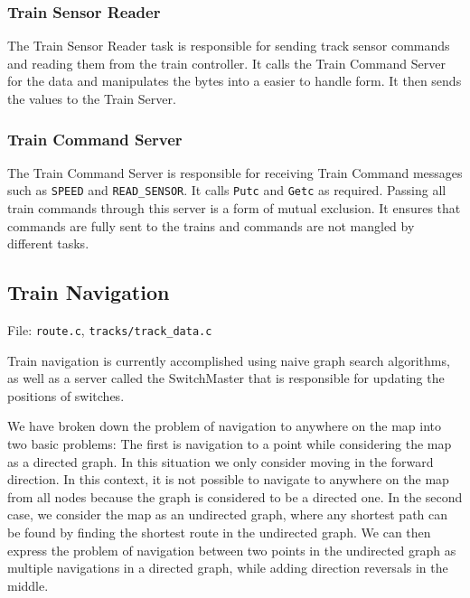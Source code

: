 \documentclass[letterpaper]{article}
\begin{document}
\subsubsection{Train Sensor Reader%
  \label{train-sensor-reader}%
}

The Train Sensor Reader task is responsible for sending track sensor commands and reading them from the train controller. It calls the Train Command Server for the data and manipulates the bytes into a easier to handle form. It then sends the values to the Train Server.


\subsubsection{Train Command Server%
  \label{train-command-server}%
}

The Train Command Server is responsible for receiving Train Command messages such as \texttt{SPEED} and \texttt{READ\_SENSOR}. It calls \texttt{Putc} and \texttt{Getc} as required. Passing all train commands through this server is a form of mutual exclusion. It ensures that commands are fully sent to the trains and commands are not mangled by different tasks.


\subsection{Train Navigation%
  \label{train-navigation}%
}

File: \texttt{route.c}, \texttt{tracks/track\_data.c}

Train navigation is currently accomplished using naive graph search algorithms, as well as a server called the SwitchMaster that is responsible for updating the positions of switches.

We have broken down the problem of navigation to anywhere on the map into two basic problems: The first is navigation to a point while considering the map as a directed graph.  In this situation we only consider moving in the forward direction.  In this context, it is not possible to navigate to anywhere on the map from all nodes because the graph is considered to be a directed one.  In the second case, we consider the map as an undirected graph, where any shortest path can be found by finding the shortest route in the undirected graph.  We can then express the problem of navigation between two points in the undirected graph as multiple navigations in a directed graph, while adding direction reversals in the middle.
\end{document}
